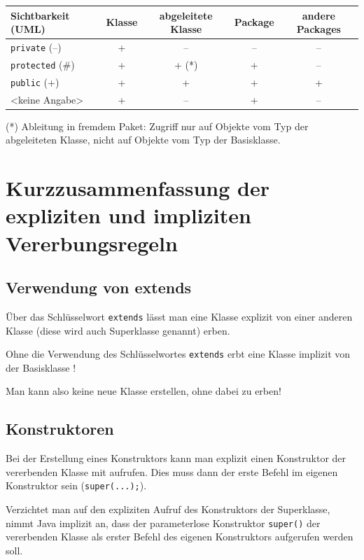 \begin{center}
\bgroup
\def\arraystretch{1.2}
\begin{tabular}{|l|c|c|c|c|}
\hline
\textbf{Sichtbarkeit (UML)} & \textbf{Klasse} & \textbf{abgeleitete
Klasse} & \textbf{Package} & \textbf{andere Packages} \\ \hline
\texttt{private} (--)   &  +  & --    & -- & -- \\ \hline
\texttt{protected} (\#) &  +  & + (*) &  + & -- \\ \hline
\texttt{public} (+)     &  +  &  +    &  + & +  \\ \hline
<keine Angabe>          &  +  & --    &  + & -- \\ \hline
\end{tabular}
\egroup
\end{center}

\noindent (*) Ableitung in fremdem Paket: Zugriff nur auf Objekte vom Typ der
abgeleiteten Klasse, nicht auf Objekte vom Typ der Basisklasse.


\section{Kurzzusammenfassung der expliziten und impliziten Vererbungsregeln}

\subsection{Verwendung von extends}

Über das Schlüsselwort \lstinline|extends| lässt man eine Klasse explizit von einer 
anderen Klasse (diese wird auch Superklasse genannt) erben.

Ohne die Verwendung des Schlüsselwortes \lstinline|extends| erbt eine Klasse implizit 
von der Basisklasse !

Man kann also keine neue Klasse erstellen, ohne dabei zu erben!


\subsection{Konstruktoren}

Bei der Erstellung eines Konstruktors kann man explizit einen Konstruktor der 
vererbenden Klasse mit aufrufen. Dies muss dann der erste Befehl im eigenen 
Konstruktor sein (\lstinline|super(...);|).

Verzichtet man auf den expliziten Aufruf des Konstruktors der Superklasse, nimmt 
Java implizit an, dass der parameterlose Konstruktor \lstinline|super()| der 
vererbenden Klasse als erster Befehl des eigenen Konstruktors aufgerufen werden 
soll.

